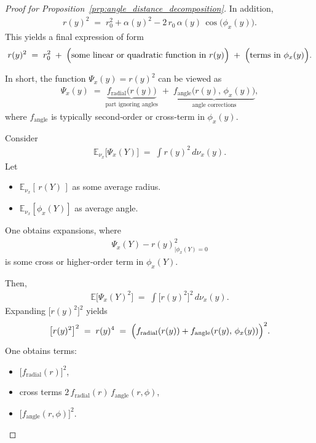 \begin{proof}[Proof for Proposition~\ref{prp:angle_distance_decomposition}]
    In addition, 
    \begin{align*}
        r(y)^2
        \;=\;
        r_0^2 + \alpha(y)^2 - 2\,r_0\,\alpha(y)\,\cos\bigl(\phi_x(y)\bigr).
    \end{align*}
    This yields a final expression of form
    \begin{align*}
        r(y)^2
          \;=\;
          r_0^2
          \;+\;
          \Bigl(\text{some linear or quadratic function in }r(y)\Bigr)
          \;+\;
          \Bigl(\text{terms in }\phi_x(y)\Bigr).
    \end{align*}

    In short, the function \(\Psi_x(y) = r(y)^2\) can be viewed as
    \begin{align*}
        \Psi_x(y)
        \;=\;
        \underbrace{f_{\mathrm{radial}}\bigl(r(y)\bigr)}_{\text{part ignoring angles}}
        \;+\;
        \underbrace{f_{\mathrm{angle}}\bigl(r(y), \,\phi_x(y)\bigr)}_{\text{angle corrections}},
    \end{align*}
    where \(f_{\mathrm{angle}}\) is typically second‐order or cross‐term in \(\phi_x(y)\).

    Consider
    \begin{align*}
        \mathbb{E}_{\nu_x}\bigl[\Psi_x(Y)\bigr]
        \;=\;
        \int r(y)^2\,d\nu_x(y).
    \end{align*}
    Let
    \begin{itemize}
        \item \( \mathbb{E}_{\nu_x}[\,r(Y)\,] \) as some average radius. 
        \item \( \mathbb{E}_{\nu_x}[\phi_x(Y)] \) as average angle.  
    \end{itemize}

    One obtains expansions, where
    \begin{align*}
        \Psi_x(Y) - r(y)^2_{\big| \phi_x(Y)=0}
    \end{align*}
    is some cross or higher‐order term in \(\phi_x(Y)\).

    Then,
    \begin{align*}
        \mathbb{E}\bigl[\Psi_x(Y)^2\bigr]
        \;=\;
        \int \bigl[r(y)^2\bigr]^2\,d\nu_x(y).
    \end{align*}
    Expanding \(\bigl[r(y)^2\bigr]^2\) yields
    \begin{align*}
        \bigl[r(y)^2\bigr]^2
        \;=\;
        r(y)^4
        \;=\;
        \Bigl( f_{\mathrm{radial}}(r(y)) + f_{\mathrm{angle}}(r(y),\,\phi_x(y)) \Bigr)^2.
    \end{align*}
    One obtains terms:
    \begin{itemize}
        \item \(\bigl[f_{\mathrm{radial}}(r)\bigr]^2\),  
        \item cross terms \(2\,f_{\mathrm{radial}}(r)\,f_{\mathrm{angle}}(r,\phi)\),  
        \item \(\bigl[f_{\mathrm{angle}}(r,\phi)\bigr]^2\).  
    \end{itemize}


\end{proof}
